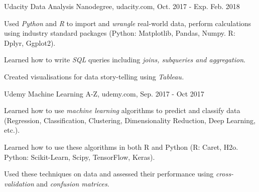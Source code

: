 


\begin{cventries}
    \cventry
      {Udacity} %
      {Data Analysis Nanodegree, } %
      {udacity.com, } %
      {Oct. 2017 - Exp. Feb. 2018} %
      {
        \begin{cvitems} %
          \item {Used \textit{Python} and \textit{R} to import and \textit{wrangle} real-world data, perform calculations using industry standard packages (Python: Matplotlib, Pandas, Numpy. R: Dplyr, Ggplot2).}
          \item {Learned how to write \textit{SQL} queries including \textit{joins, subqueries and aggregation}.}
          \item {Created visualisations for data story-telling using \textit{Tableau.}}
        \end{cvitems}
      }


      \cventry
      {Udemy} %
      {Machine Learning A-Z, } %
      {udemy.com, } %
      {Sep. 2017 - Oct 2017} %
      {
        \begin{cvitems} %
          \item {Learned how to use \textit{machine learning} algorithms to predict and classify data (Regression, Classification, Clustering, Dimensionality Reduction, Deep Learning, etc.).}
          \item {Learned how to use these algorithms in both R and Python (R: Caret, H2o. Python: Scikit-Learn, Scipy, TensorFlow, Keras).}
          \item {Used these techniques on data and assessed their performance using \textit{cross-validation} and \textit{confusion matrices}.}
        \end{cvitems}
      }



\end{cventries}
